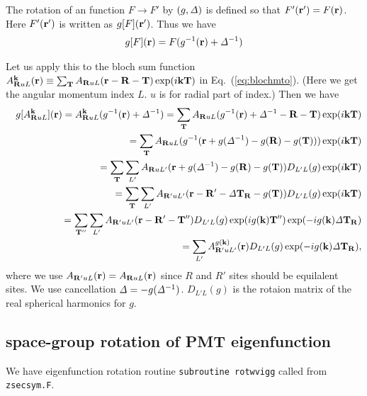 \documentclass[a4paper,10pt,fleqn]{article}
\def\iDelta{{\it \Delta}}
\def\iDelta{{\it \Delta}}
\newcommand{\bfk}{{\bf k}}
\newcommand{\bfr}{{\bf r}}
\newcommand{\bfT}{{\bf T}}
\newcommand{\bfR}{{\bf R}}
\newcommand{\req}[1]{\mbox{Eq.~(\ref{#1})}}
\begin{document}
The rotation of an function $F \to F'$ by $(g,\iDelta)$
is defined so that $F'(\bfr')=F(\bfr)$. Here $F'(\bfr')$ is written as $g[F](\bfr')$.
Thus we have
\begin{eqnarray}
g[F](\bfr)=F(g^{-1}(\bfr)+\iDelta^{-1})
\end{eqnarray}

Let us apply this to the bloch sum function
$A^{\bf k}_{\bfR u L}({\bf r}) \equiv \sum_{\bf T} 
A_{\bfR u L}({\bf r-R-T}) \exp(i {\bf kT})$ in \req{eq:blochmto}.
(Here we get the angular momentum index $L$. $u$ is for radial part of index.)
Then we have
\begin{eqnarray}
&&g[A^{\bf k}_{\bfR u L}](\bfr)=A^{\bf k}_{\bfR u L}(g^{-1}(\bfr)+\iDelta^{-1})
=\sum_\bfT A_{\bfR u L}(g^{-1}(\bfr)+\iDelta^{-1} -\bfR-\bfT) \exp(i {\bf kT}) \nonumber \\
&&=\sum_\bfT A_{\bfR u L}(g^{-1}(\bfr+g(\iDelta^{-1}) -g(\bfR)-g(\bfT)))
 \exp(i {\bf kT}) \nonumber \\
&&=\sum_\bfT \sum_{L'}  A_{\bfR u L'} (\bfr+g(\iDelta^{-1}) -g(\bfR)-g(\bfT))D_{L'L}(g) \exp(i {\bf kT}) \nonumber \\
&&=\sum_\bfT \sum_{L'}  A_{\bfR' u L'}(\bfr-\bfR'-\iDelta  \bfT_\bfR -g(\bfT)) D_{L'L}(g)\exp(i {\bf kT}) \nonumber \\
&&=\sum_{\bfT''} \sum_{L'}  A_{\bfR' u L'}(\bfr-\bfR'-\bfT'') D_{L'L}(g)
 \exp(i g(\bfk){\bfT}'') \exp(-i g(\bfk)\iDelta \bfT_\bfR) \nonumber \\
&&= \sum_{L'}  A^{g(\bfk)}_{\bfR' u L'}(\bfr) D_{L'L}(g) \exp(-i g(\bfk)\iDelta \bfT_\bfR),
\label{eq:eigenrot}
\end{eqnarray}
where we use $A_{\bfR' u L}(\bfr)=A_{\bfR u L}(\bfr)$ since $R$ and $R'$
sites should be equilalent sites. We use cancellation $\iDelta=-g(\iDelta^{-1})$.
$D_{L'L}(g)$ is the rotaion matrix of the real spherical harmonics for $g$.

\subsection{space-group rotation of PMT eigenfunction}
We have eigenfunction rotation routine \verb#subroutine rotwvigg# called from \verb#zsecsym.F#.
\end{document}
